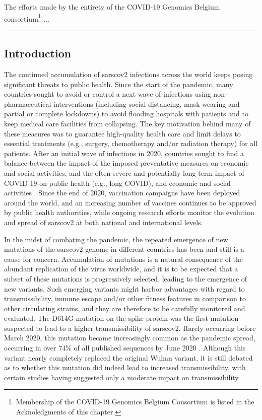 The efforts made by the entirety of the COVID-19 Genomics Belgium consortium\footnote{Membership of the COVID-19 Genomics Belgium Consortium is listed in the Acknoledgments of this chapter.} ...
\vspace*{12pt}
\hrule

\onehalfspacing

\subsection{Introduction}
The continued accumulation of \gls{sarscov2} infections across the world keeps posing significant threats to public health.
Since the start of the pandemic, many countries sought to avoid or control a next wave of infections using non-pharmaceutical interventions (including social distancing, mask wearing and partial or complete lockdowns) to avoid flooding hospitals with patients and to keep medical care facilities from collapsing.
The key motivation behind many of these measures was to guarantee high-quality health care and limit delays to essential treatments (e.g., surgery, chemotherapy and/or radiation therapy) for all patients.
After an initial wave of infections in 2020, countries sought to find a balance between the impact of the imposed preventative measures on economic and social activities, and the often severe and potentially long-term impact of COVID-19 on public health (e.g., long COVID), and economic and social activities \citep{zivin2020spread}.
Since the end of 2020, vaccination campaigns have been deployed around the world, and an increasing number of vaccines continues to be approved by public health authorities, while ongoing research efforts monitor the evolution and spread of \gls{sarscov2} at both national and international levels.

In the midst of combating the pandemic, the repeated emergence of new mutations of the \gls{sarscov2} genome in different countries has been and still is a cause for concern.
Accumulation of mutations is a natural consequence of the abundant replication of the virus worldwide, and it is to be expected that a subset of these mutations is progressively selected, leading to the emergence of new variants.
Such emerging variants might harbor advantages with regard to transmissibility, immune escape and/or other fitness features in comparison to other circulating strains, and they are therefore to be carefully monitored and evaluated.
The D614G mutation on the spike protein was the first mutation suspected to lead to a higher transmissibility of \gls{sarscov2}.
Rarely occurring before March 2020, this mutation became increasingly common as the pandemic spread, occurring in over 74\% of all published sequences by June 2020 \citep{korber2020tracking,plante2021spike}.
Although this variant nearly completely replaced the original Wuhan variant, it is still debated as to whether this mutation did indeed lead to increased transmissibility, with certain studies having suggested only a moderate impact on transmissibility \citep{cogUKreport1,volz2021evaluating}.

